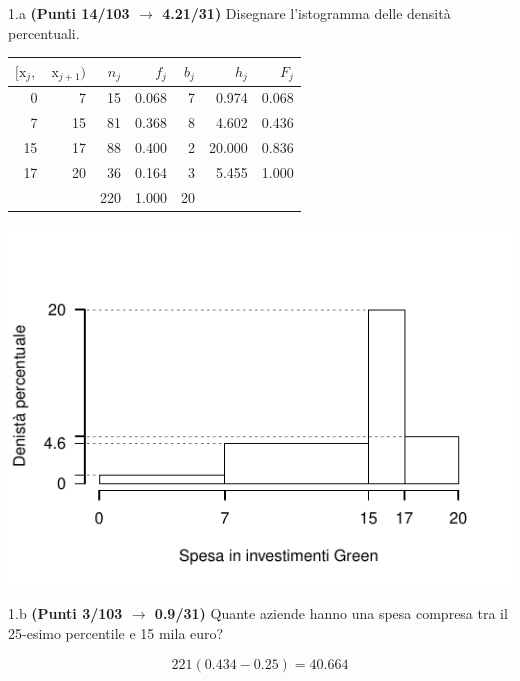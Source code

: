 \documentclass[
  11pt,
]{book}
\theoremstyle{mytheoremstyle}
\theoremstyle{mydefstyle}
\newenvironment{sol}
  {
  \begin{tcolorbox}[enhanced,breakable,arc=0.1mm,boxrule=1pt,colback=white,colframe=iblue,
  title=\bf \fontfamily{lmss}\selectfont \hspace{.5 cm} Soluzione,drop fuzzy shadow]

}{
\end{tcolorbox}
  }
\begin{document}
1.a \textbf{(Punti 14/103 \(\rightarrow\) 4.21/31)} Disegnare l'istogramma delle densità percentuali.

\begin{sol}

\begin{table}[H]
\centering
\begin{tabular}{rrrrrrr}
\toprule
$[\text{x}_j,$ & $\text{x}_{j+1})$ & $n_j$ & $f_j$ & $b_j$ & $h_j$ & $F_j$\\
\midrule
0 & 7 & 15 & 0.068 & 7 & 0.974 & 0.068\\
7 & 15 & 81 & 0.368 & 8 & 4.602 & 0.436\\
15 & 17 & 88 & 0.400 & 2 & 20.000 & 0.836\\
17 & 20 & 36 & 0.164 & 3 & 5.455 & 1.000\\
 &  & 220 & 1.000 & 20 &  & \\
\bottomrule
\end{tabular}
\end{table}

\begin{center}\includegraphics{Esami_passati_con_soluzioni_files/figure-latex/2022-56-1} \end{center}

\end{sol}

1.b \textbf{(Punti 3/103 \(\rightarrow\) 0.9/31)} Quante aziende hanno una spesa compresa tra il 25-esimo percentile e 15 mila euro?

\begin{sol}
\[
221(0.434-0.25)=40.664
\]

\end{sol}
\end{document}
